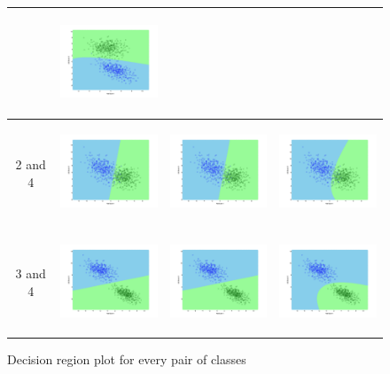 \documentclass[a4paper]{article}
\begin{document}
\begin{figure}
\begin{tabular}{|c|c|c|c|}
				&\includegraphics[width=40mm,height=30mm]{bayes/over/pair/23/diff_cov.png}\\
				\hline
				2 and
				4&\includegraphics[width=40mm,height=30mm]{bayes/over/pair/24/all_cov.png}&\includegraphics[width=40mm,height=30mm]{bayes/over/pair/24/avg_cov.png}
				&\includegraphics[width=40mm,height=30mm]{bayes/over/pair/24/diff_cov.png}\\
				\hline
				3 and
				4&\includegraphics[width=40mm,height=30mm]{bayes/over/pair/34/all_cov.png}&\includegraphics[width=40mm,height=30mm]{bayes/over/pair/34/avg_cov.png}
				&\includegraphics[width=40mm,height=30mm]{bayes/over/pair/34/diff_cov.png}\\
				\hline
				
			\end{tabular}
			\caption{Decision region plot for every pair of classes}
			\end{figure}
		
\end{document}
